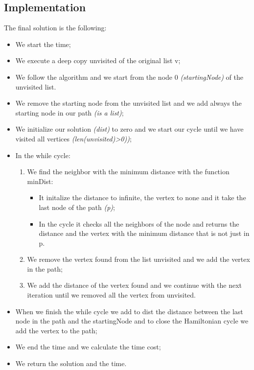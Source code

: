 \subsection{Implementation}
The final solution is the following:
\begin{itemize}
	\item We start the time;
	\item We execute a deep copy unvisited of the original list v;
	\item We follow the algorithm and we start from the node 0 \textit{(startingNode)} of the unvisited list. 
	\item We remove the starting node from the unvisited list and we add always the starting node in our path \textit{(is a list)};
	\item We initialize our solution \textit{(dist)} to zero and we start our cycle until we have visited all vertices \textit{(len(unvisited)>0))};
	\item In the while cycle:
		\begin{enumerate}
			\item  We find the neighbor with the minimum distance with the function minDist:
				\begin{itemize}
				\item  It initalize the distance to infinite, the vertex to none and it take the last node of the path \textit{(p)};
				\item  In the cycle it checks all the neighbors of the node and returns the distance and the vertex with the minimum distance that is not just in p.
				\end{itemize}
			\item We remove the vertex found from the list unvisited and we add the vertex in the path;
			\item We add the distance of the vertex found and we continue with the next iteration until we removed all the vertex from unvisited. 
		\end{enumerate}
	\item When we finish the while cycle we add to dist the distance between the last node in the path and the startingNode and to close the Hamiltonian cycle we add the vertex to the path;
	\item We end the time and we calculate the time cost;
	\item We return the solution and the time.
\end{itemize}

\pagebreak